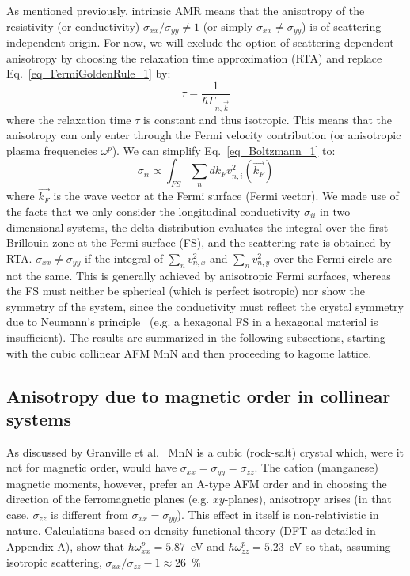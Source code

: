 \documentclass[prb,showpacs,amsmath,amssymb,superscriptaddress,twocolumn,floatfix]{revtex4-1}
\begin{document}
As mentioned previously, intrinsic AMR means that the anisotropy of
the resistivity (or conductivity) $\sigma_{xx} / \sigma_{yy} \neq 1$
(or simply $\sigma_{xx} \neq \sigma_{yy}$) is of
scattering-independent origin. For now, we will exclude the option of scattering-dependent anisotropy by choosing the relaxation time approximation (RTA)\cite{Vyborny:2009_a} and replace Eq.~\ref{eq_FermiGoldenRule_1} by:
\begin{equation}
	\tau = \frac{1}{\hbar \Gamma_{n, \vec{k}}}
\end{equation}
where the relaxation time $\tau$ is constant and thus isotropic. This
means that the anisotropy can only enter through the Fermi velocity
contribution (or anisotropic plasma frequencies $\omega^p$). We can simplify Eq.~\ref{eq_Boltzmann_1} to:
%
\begin{equation}
	\sigma_{ii} \propto \int_ {FS} \sum_n   dk_F  v^2_{n,i}(\vec{k_F})
	\label{eq_Boltzmann_2}
\end{equation}
%
where {\color{red}$\vec{k_F}$ is the wave vector at the Fermi surface} (Fermi
vector).
We made use of the facts that we only consider the
longitudinal conductivity $\sigma_{ii}$ in two dimensional systems,
the delta distribution evaluates the integral over the first Brillouin
zone at the Fermi surface (FS), and the scattering rate is obtained by
RTA. $\sigma_{xx} \neq \sigma_{yy}$ if the integral of $\sum_n
v^2_{n,x}$ and $\sum_n v^2_{n,y}$ over the Fermi circle are not the
same. This is generally achieved by anisotropic Fermi surfaces,
whereas the FS must neither be spherical (which is perfect isotropic)
nor show the symmetry of the system, since the conductivity must
reflect the crystal symmetry due to Neumann's
principle~\cite{Ritzinger:2021} (e.g. a hexagonal FS in a hexagonal
material is insufficient). The results are summarized in the following
subsections, starting with the cubic collinear AFM MnN and
then proceeding to kagome lattice.

\subsection{Anisotropy due to magnetic order in collinear systems}

As discussed by Granville et al.~\cite{g} %
MnN is a cubic
(rock-salt) crystal which, were it not for magnetic order, would have
$\sigma_{xx}=\sigma_{yy}=\sigma_{zz}$. The cation (manganese)
magnetic moments, however, prefer an A-type AFM order and in choosing
the direction of the ferromagnetic planes (e.g. $xy$-planes),
anisotropy arises (in that case, $\sigma_{zz}$ is different from
$\sigma_{xx}=\sigma_{yy}$). This effect in itself is non-relativistic in nature.
Calculations based on density functional theory (DFT as 
detailed in Appendix A), show that
$\hbar\omega^p_{xx}=5.87$~eV and $\hbar\omega^p_{zz}=5.23$~eV so that,
assuming isotropic scattering, $\sigma_{xx}/\sigma_{zz}-1\approx 26$~\%
\end{document}
